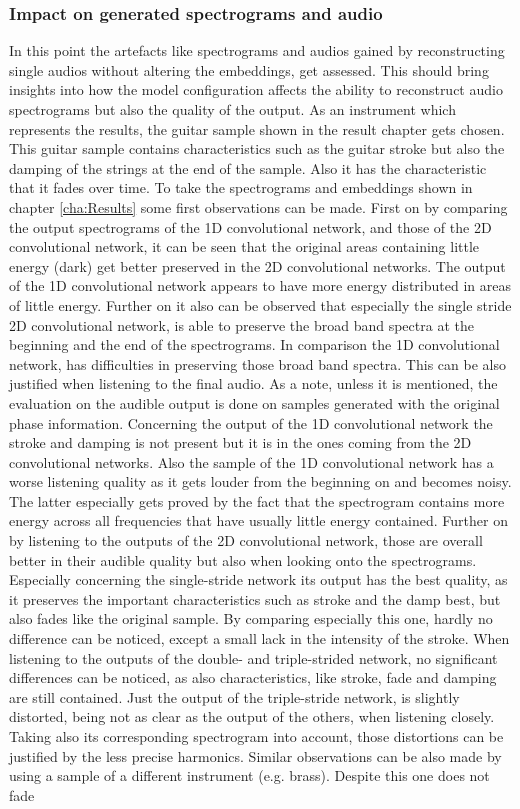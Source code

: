 \subsubsection{Impact on generated spectrograms and audio}
In this point the artefacts like spectrograms and audios gained by reconstructing single audios without altering the embeddings, get assessed. This should bring insights into how the model configuration affects the ability to reconstruct audio spectrograms but also the quality of the output. As an instrument which represents the results, the guitar sample shown in the result chapter gets chosen. This guitar sample contains characteristics such as the guitar stroke but also the damping of the strings at the end of the sample. Also it has the characteristic that it fades over time. To take the spectrograms and embeddings shown in chapter \ref{cha:Results} some first observations can be made. First on by comparing the output spectrograms of the 1D convolutional network, and those of the 2D convolutional network, it can be seen that the original areas containing little energy (dark) get better preserved in the 2D convolutional networks. The output of the 1D convolutional network appears to have more energy distributed in areas of little energy. Further on it also can be observed that especially the single stride 2D convolutional network, is able to preserve the broad band spectra at the beginning and the end of the spectrograms. In comparison the 1D convolutional network, has difficulties in preserving those broad band spectra. This can be also justified when listening to the final audio. As a note, unless it is mentioned, the evaluation on the audible output is done on samples generated with the original phase information. Concerning the output of the 1D convolutional network the stroke and damping is not present but it is in the ones coming from the 2D convolutional networks. Also the sample of the 1D convolutional network has a worse listening quality as it gets louder from the beginning on and becomes noisy. The latter especially gets proved by the fact that the spectrogram contains more energy across all frequencies that have usually little energy contained. Further on by listening to the outputs of the 2D convolutional network, those are overall better in their audible quality but also when looking onto the spectrograms. Especially concerning the single-stride network its output has the best quality, as it preserves the important characteristics such as stroke and the damp best, but also fades like the original sample. By comparing especially this one, hardly no difference can be noticed, except a small lack in the intensity of the stroke. When listening to the outputs of the double- and triple-strided network, no significant differences can be noticed, as also characteristics, like stroke, fade and damping are still contained. Just the output of the triple-stride network, is slightly distorted, being not as clear as the output of the others, when listening closely. Taking also its corresponding spectrogram into account, those distortions can be justified by the less precise harmonics. Similar observations can be also made by using a sample of a different instrument (e.g. brass). Despite this one does not fade 